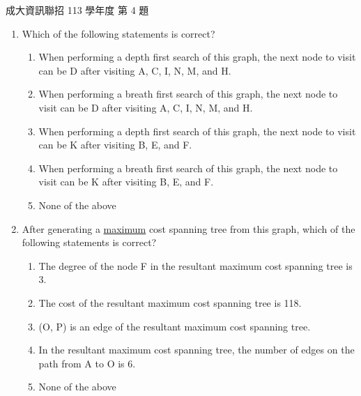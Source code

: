 \begin{pastexam}[label={px:ncku-113-prog-04}]{成大資訊聯招 113 學年度 第 4 題}
\begin{enumerate}[label=\roman*)]
\item Which of the following statements is correct?
\begin{enumerate}[label=(\Alph*)]
\item When performing a depth first search of this graph, the next node to visit can be D after
visiting A, C, I, N, M, and H.
\item When performing a breath first search of this graph, the next node to visit can be D after
visiting A, C, I, N, M, and H.
\item When performing a depth first search of this graph, the next node to visit can be K after
visiting B, E, and F.
\item When performing a breath first search of this graph, the next node to visit can be K after
visiting B, E, and F.
\item None of the above
\end{enumerate}
\item After generating a \underline{maximum} cost spanning tree from this graph, which of the
following statements is correct?
\begin{enumerate}[label=(\Alph*)]
\item The degree of the node F in the resultant maximum cost spanning tree is 3.
\item The cost of the resultant maximum cost spanning tree is 118.
\item (O, P) is an edge of the resultant maximum cost spanning tree.
\item In the resultant maximum cost spanning tree, the number of edges on the path from A to O is
6.
\item None of the above
\end{enumerate}
\end{enumerate}
\end{pastexam}

